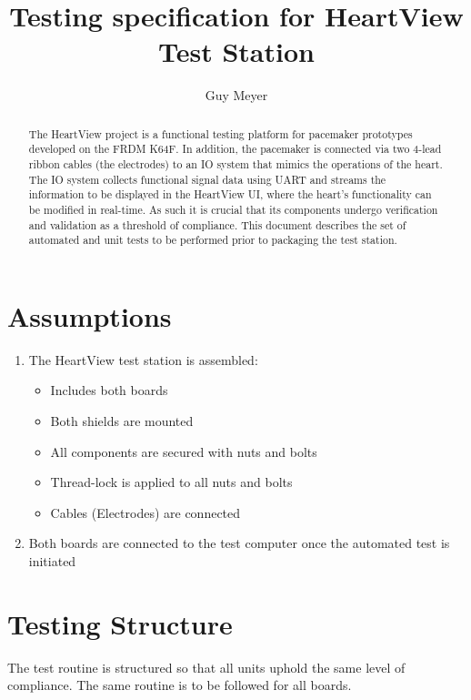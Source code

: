 \documentclass[]{article}
\title{Testing specification for HeartView Test Station}
\author{Guy Meyer}
\begin{document}
	
\setlength\parindent{0pt}

\maketitle

\begin{abstract}
The HeartView project is a functional testing platform for pacemaker prototypes developed on the FRDM K64F. In addition, the pacemaker is connected via two 4-lead ribbon cables (the electrodes) to an IO system that mimics the operations of the heart. The IO system collects functional signal data using UART and streams the information to be displayed in the HeartView UI, where the heart's functionality can be modified in real-time. As such it is crucial that its components undergo verification and validation as a threshold of compliance. This document describes the set of automated and unit tests to be performed prior to packaging the test station. 
\end{abstract}

\section{Assumptions}

\begin{enumerate}
	\item The HeartView test station is assembled:
	\begin{itemize}
		\item Includes both boards
		\item Both shields are mounted
		\item All components are secured with nuts and bolts
		\item Thread-lock is applied to all nuts and bolts
		\item Cables (Electrodes) are connected
	\end{itemize}

	\item Both boards are connected to the test computer once the automated test is initiated
\end{enumerate}

\section{Testing Structure}
The test routine is structured so that all units uphold the same level of compliance. The same routine is to be followed for all boards. \\
\end{document}
